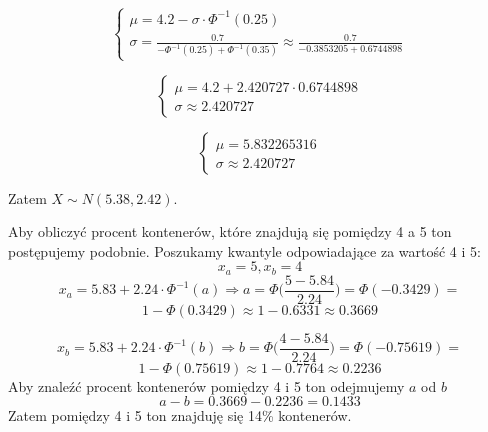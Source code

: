 \documentclass{article}
\begin{document}
$$
\left\{ 
\begin{array}{l}
\mu = 4.2 - \sigma\cdot\Phi^{-1}(0.25) \\
\sigma = \frac{0.7}{-\Phi^{-1}(0.25) + \Phi^{-1}(0.35)} \approx \frac{0.7}{-0.3853205+0.6744898}
\end{array}
\right.
$$

$$
\left\{ 
\begin{array}{l}
\mu = 4.2 + 2.420727\cdot 0.6744898\\
\sigma \approx 2.420727
\end{array}
\right.
$$

$$
\left\{ 
\begin{array}{l}
\mu = 5.832265316\\
\sigma \approx 2.420727
\end{array}
\right.
$$

Zatem $X\sim N(5.38,2.42)$.\\
\par
Aby obliczyć procent kontenerów, które znajdują się pomiędzy 4 a 5 ton postępujemy podobnie.
Poszukamy kwantyle odpowiadające za wartość 4 i 5:
$$x_a = 5, x_b=4$$
$$x_a = 5.83 + 2.24\cdot\Phi^{-1}(a) \Rightarrow a = \Phi\Big(\frac{5 - 5.84}{2.24}\Big) = \Phi(-0.3429) =$$
$$1 - \Phi(0.3429) \approx 1 - 0.6331 \approx 0.3669$$

$$x_b = 5.83 + 2.24\cdot\Phi^{-1}(b) \Rightarrow b = \Phi\Big(\frac{4 - 5.84}{2.24}\Big) = \Phi(-0.75619) =$$
$$1 - \Phi(0.75619) \approx 1 - 0.7764 \approx 0.2236$$
Aby znaleźć procent kontenerów pomiędzy 4 i 5 ton odejmujemy $a$ od $b$
$$a - b = 0.3669 - 0.2236 = 0.1433$$
Zatem pomiędzy 4 i 5 ton znajduję się 14\% kontenerów.

\newpage

\end{document}

